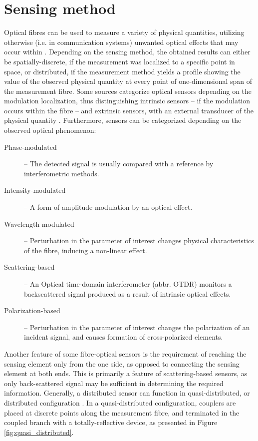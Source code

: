 \documentclass{standalone}
\begin{document}
\chapter{Sensing method}
\setcounter{page}\thestranica


Optical fibres can be used to measure a variety of physical quantities, utilizing otherwise (i.e. in communication systems) unwanted optical effects that may occur within \cite{krohnFundamentals}. Depending on the sensing method, the obtained results can either be spatially-discrete, if the measurement was localized to a specific point in space, or distributed, if the measurement method yields a profile showing the value of the observed physical quantity at every point of one-dimensional span of the measurement fibre. Some sources categorize optical sensors depending on the modulation localization, thus distinguishing intrinsic sensors -- if the modulation occurs within the fibre -- and extrinsic sensors, with an external transducer of the physical quantity \cite{mitschke2010fiber}. Furthermore, sensors can be categorized depending on the observed optical phenomenon:
\begin{description}
	\item[Phase-modulated] -- The detected signal is usually compared with a reference by interferometric methods.
	\item[Intensity-modulated] -- A form of amplitude modulation by an optical effect.
	\item[Wavelength-modulated] -- Perturbation in the parameter of interest changes physical characteristics of the fibre, inducing a non-linear effect.
	\item[Scattering-based] -- An Optical time-domain interferometer (abbr. OTDR) monitors a backscattered signal produced as a result of intrinsic optical effects.
	\item[Polarization-based] -- Perturbation in the parameter of interest changes the polarization of an incident signal, and causes formation of cross-polarized elements.
\end{description}
Another feature of some fibre-optical sensors is the requirement of reaching the sensing element only from the one side, as opposed to connecting the sensing element at both ends. This is primarily a feature of scattering-based sensors, as only back-scattered signal may be sufficient in determining the required information. Generally, a distributed sensor can function in quasi-distributed, or distributed configuration \cite{Rogers1999}. In a quasi-distributed configuration, couplers are placed at discrete points along the measurement fibre, and terminated in the coupled branch with a totally-reflective device, as presented in Figure \ref{fig:quasi_distributed}.
\end{document}
